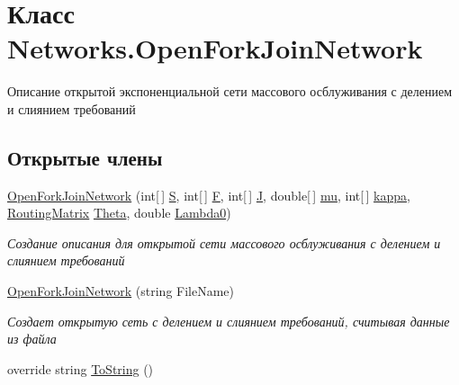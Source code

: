 \hypertarget{class_networks_1_1_open_fork_join_network}{}\section{Класс Networks.\+Open\+Fork\+Join\+Network}
\label{class_networks_1_1_open_fork_join_network}


Описание открытой экспоненциальной сети массового осблуживания с делением и слиянием требований  


\subsection*{Открытые члены}
\begin{DoxyCompactItemize}
\item 
\hyperlink{class_networks_1_1_open_fork_join_network_ad76cb9db085f7d82d459ee948d3e23f5}{Open\+Fork\+Join\+Network} (int\mbox{[}$\,$\mbox{]} \hyperlink{class_networks_1_1_open_fork_join_network_a3081d74c0bb207dc059d4e7819c0791e}{S}, int\mbox{[}$\,$\mbox{]} \hyperlink{class_networks_1_1_open_fork_join_network_a7ac77530707bda1d810cc2ed1863873c}{F}, int\mbox{[}$\,$\mbox{]} \hyperlink{class_networks_1_1_open_fork_join_network_abb49a6f019bb66407f47d123a42e12e2}{J}, double\mbox{[}$\,$\mbox{]} \hyperlink{class_networks_1_1_open_fork_join_network_a75f0a3941eda4e65c1350cdf73b3d672}{mu}, int\mbox{[}$\,$\mbox{]} \hyperlink{class_networks_1_1_open_fork_join_network_a053e2c3df6d037b4e09bd03384b11089}{kappa}, \hyperlink{class_networks_1_1_routing_matrix}{Routing\+Matrix} \hyperlink{class_networks_1_1_open_fork_join_network_a3cc59e2da1ed4cd8efc9c799664d6590}{Theta}, double \hyperlink{class_networks_1_1_open_fork_join_network_a0e64e4ae41267b61cc4ceb06479cbaed}{Lambda0})
\begin{DoxyCompactList}\small\item\em Создание описания для открытой сети массового осблуживания с делением и слиянием требований \end{DoxyCompactList}\item 
\hyperlink{class_networks_1_1_open_fork_join_network_a79896a16e83de70f1410b5ef67761123}{Open\+Fork\+Join\+Network} (string File\+Name)
\begin{DoxyCompactList}\small\item\em Создает открытую сеть с делением и слиянием требований, считывая данные из файла \end{DoxyCompactList}\item 
override string \hyperlink{class_networks_1_1_open_fork_join_network_af895b093e2dce58e977dffbbc44c66c1}{To\+String} ()
\end{DoxyCompactItemize}
